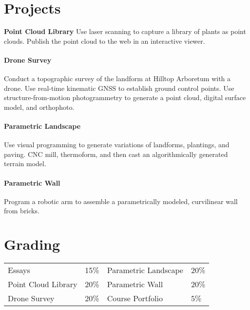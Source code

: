 \documentclass[11pt,article,oneside]{memoir}
\begin{document}
\nocite{*} \printbibliography[keyword=b, heading=none]

\section{Projects}

\noindent \textbf{Point Cloud Library}
Use laser scanning to capture a library of plants as point clouds. 
Publish the point cloud to the web in an interactive viewer.
\\

\paragraph{Drone Survey}
Conduct a topographic survey 
of the landform at Hilltop Arboretum
with a drone.
Use real-time kinematic GNSS
to establish ground control points. 
Use structure-from-motion photogrammetry 
to generate a point cloud, 
digital surface model, 
and orthophoto.
\\

\paragraph{Parametric Landscape}
Use visual programming to generate
variations of landforms, plantings, and paving.
CNC mill, thermoform, and then cast 
an algorithmically generated terrain model.
\\

\paragraph{Parametric Wall}
Program a robotic arm to assemble 
a parametrically modeled, curvilinear wall
from bricks.
\\

\section{Grading}
%
\begin{table}[H]
\begin{tabular}{l r @{\hskip 2cm} l @{\hskip 0.5cm} l}
%
Essays & 15\% &  Parametric Landscape & 20\% \\
Point Cloud Library & 20\% & Parametric Wall & 20\%\\
Drone Survey & 20\% & Course Portfolio & 5\% \\
%
\end{tabular}
\end{table}
\end{document}
